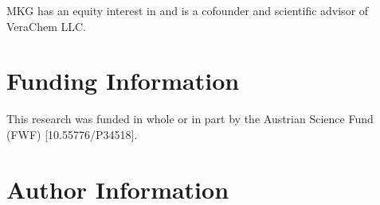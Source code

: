 \documentclass[9pt,tutorial,pubversion]{livecoms}
\begin{document}
MKG has an equity interest in and is a cofounder and scientific advisor of 
VeraChem LLC.

\section*{Funding Information}
This research was funded in whole or in part by the Austrian Science Fund (FWF) [10.55776/P34518].
\section*{Author Information}
\makeorcid




\end{document}

